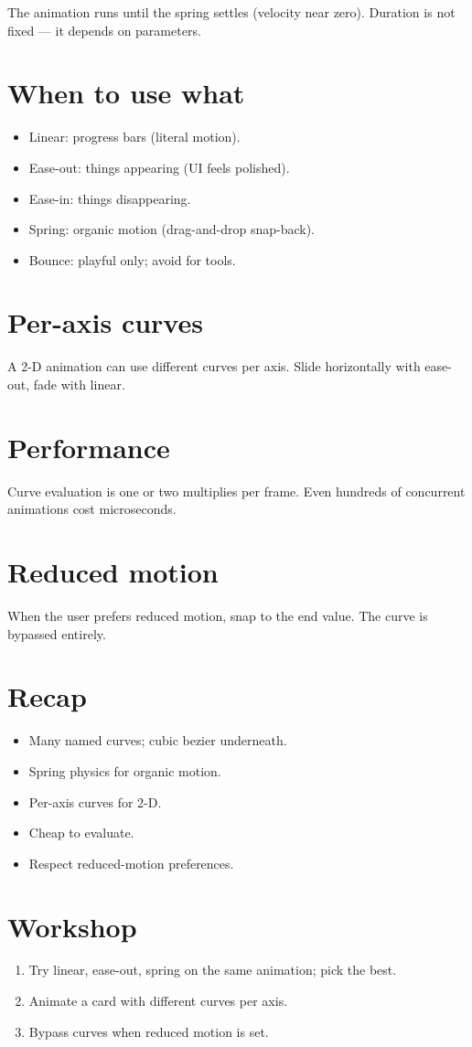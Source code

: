 The animation runs until the spring settles (velocity
near zero). Duration is not fixed --- it depends on
parameters.

\section{When to use what}

\begin{itemize}[leftmargin=*]
  \item Linear: progress bars (literal motion).
  \item Ease-out: things appearing (UI feels polished).
  \item Ease-in: things disappearing.
  \item Spring: organic motion (drag-and-drop snap-back).
  \item Bounce: playful only; avoid for tools.
\end{itemize}

\section{Per-axis curves}

A 2-D animation can use different curves per axis. Slide
horizontally with ease-out, fade with linear.

\section{Performance}

Curve evaluation is one or two multiplies per frame. Even
hundreds of concurrent animations cost microseconds.

\section{Reduced motion}

When the user prefers reduced motion, snap to the end
value. The curve is bypassed entirely.

\section{Recap}

\begin{recap}
\begin{itemize}[leftmargin=*]
  \item Many named curves; cubic bezier underneath.
  \item Spring physics for organic motion.
  \item Per-axis curves for 2-D.
  \item Cheap to evaluate.
  \item Respect reduced-motion preferences.
\end{itemize}
\end{recap}

\section*{Workshop}

\begin{enumerate}[leftmargin=*]
  \item Try linear, ease-out, spring on the same
    animation; pick the best.
  \item Animate a card with different curves per axis.
  \item Bypass curves when reduced motion is set.
\end{enumerate}
